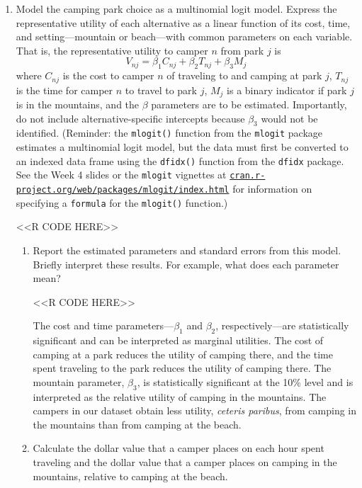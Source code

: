 \documentclass[11pt,letterpaper]{article}
\begin{document}
\begin{enumerate}[label=\alph*., leftmargin=*]
	\item Model the camping park choice as a multinomial logit model. Express the representative utility of each alternative as a linear function of its cost, time, and setting---mountain or beach---with common parameters on each variable. That is, the representative utility to camper $n$ from park $j$ is
	$$V_{nj} = \beta_1 C_{nj} + \beta_2 T_{nj} + \beta_3 M_j$$
	where $C_{nj}$ is the cost to camper $n$ of traveling to and camping at park $j$, $T_{nj}$ is the time for camper $n$ to travel to park $j$, $M_j$ is a binary indicator if park $j$ is in the mountains, and the $\beta$ parameters are to be estimated. Importantly, do not include alternative-specific intercepts because $\beta_3$ would not be identified. (Reminder: the \texttt{mlogit()} function from the \texttt{mlogit} package estimates a multinomial logit model, but the data must first be converted to an indexed data frame using the \texttt{dfidx()} function from the \texttt{dfidx} package. See the Week 4 slides or the \texttt{mlogit} vignettes at \href{https://cran.r-project.org/web/packages/mlogit/index.html}{\texttt{cran.r-project.org/web/packages/mlogit/index.html}} for information on specifying a \texttt{formula} for the \texttt{mlogit()} function.)

	<<R CODE HERE>>

	\begin{enumerate}[label=\roman*.]
		\item Report the estimated parameters and standard errors from this model. Briefly interpret these results. For example, what does each parameter mean?

		<<R CODE HERE>>

		The cost and time parameters---$\beta_1$ and $\beta_2$, respectively---are statistically significant and can be interpreted as marginal utilities. The cost of camping at a park reduces the utility of camping there, and the time spent traveling to the park reduces the utility of camping there. The mountain parameter, $\beta_3$, is statistically significant at the 10\% level and is interpreted as the relative utility of camping in the mountains. The campers in our dataset obtain less utility, \emph{ceteris paribus}, from camping in the mountains than from camping at the beach.

		\item Calculate the dollar value that a camper places on each hour spent traveling and the dollar value that a camper places on camping in the mountains, relative to camping at the beach.


\end{enumerate}
\end{enumerate}
\end{document}

